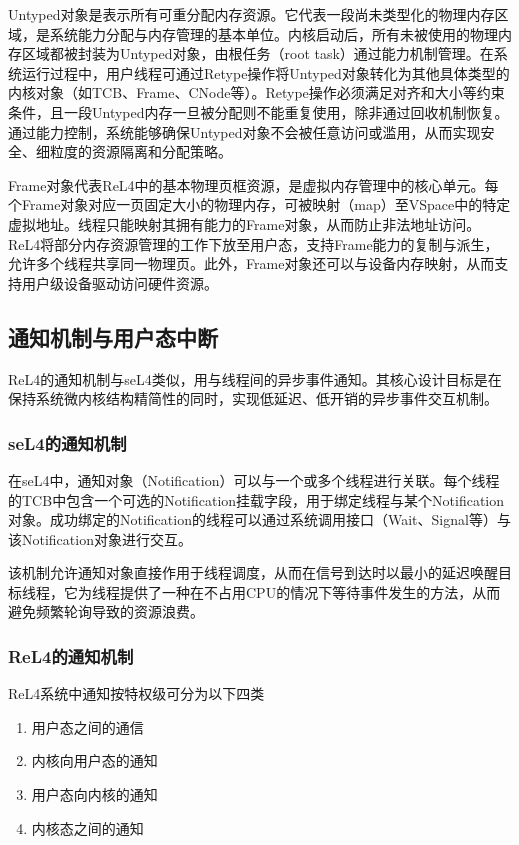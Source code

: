 Untyped对象是表示所有可重分配内存资源。它代表一段尚未类型化的物理内存区域，是系统能力分配与内存管理的基本单位。内核启动后，所有未被使用的物理内存区域都被封装为Untyped对象，由根任务（root task）通过能力机制管理。在系统运行过程中，用户线程可通过Retype操作将Untyped对象转化为其他具体类型的内核对象（如TCB、Frame、CNode等）。Retype操作必须满足对齐和大小等约束条件，且一段Untyped内存一旦被分配则不能重复使用，除非通过回收机制恢复。通过能力控制，系统能够确保Untyped对象不会被任意访问或滥用，从而实现安全、细粒度的资源隔离和分配策略。


Frame对象代表ReL4中的基本物理页框资源，是虚拟内存管理中的核心单元。每个Frame对象对应一页固定大小的物理内存，可被映射（map）至VSpace中的特定虚拟地址。线程只能映射其拥有能力的Frame对象，从而防止非法地址访问。ReL4将部分内存资源管理的工作下放至用户态，支持Frame能力的复制与派生，允许多个线程共享同一物理页。此外，Frame对象还可以与设备内存映射，从而支持用户级设备驱动访问硬件资源。


\subsection{通知机制与用户态中断}\label{sec:notification}

ReL4的通知机制与seL4类似，用与线程间的异步事件通知。其核心设计目标是在保持系统微内核结构精简性的同时，实现低延迟、低开销的异步事件交互机制。

\subsubsection{seL4的通知机制}

在seL4中，通知对象（Notification）可以与一个或多个线程进行关联。每个线程的TCB中包含一个可选的Notification挂载字段，用于绑定线程与某个Notification对象。成功绑定的Notification的线程可以通过系统调用接口（Wait、Signal等）与该Notification对象进行交互。

该机制允许通知对象直接作用于线程调度，从而在信号到达时以最小的延迟唤醒目标线程，它为线程提供了一种在不占用CPU的情况下等待事件发生的方法，从而避免频繁轮询导致的资源浪费。

\subsubsection{ReL4的通知机制}

ReL4系统中通知按特权级可分为以下四类

\begin{enumerate}
    \item 用户态之间的通信
    \item 内核向用户态的通知
    \item 用户态向内核的通知
    \item 内核态之间的通知
\end{enumerate}

